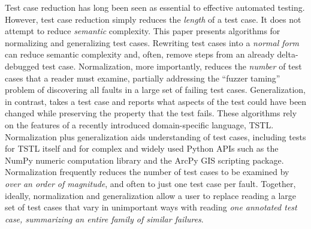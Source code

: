 Test case reduction has long been seen as essential to effective automated testing.  However, test case reduction simply reduces the \emph{length} of a test case.  It does not attempt to reduce \emph{semantic} complexity.  This paper presents algorithms for normalizing and generalizing test cases.  Rewriting test cases into a \emph{normal form} can reduce semantic complexity and, often, remove steps from an already delta-debugged test case.  Normalization, more importantly, reduces the \emph{number} of test cases that a reader must examine, partially addressing the ``fuzzer taming'' problem of discovering all faults in a large set of failing test cases.  Generalization, in contrast, takes a test case and reports what aspects of the test could have been changed while preserving the property that the test fails.  These algorithms rely on the features of a recently introduced domain-specific language, TSTL.  Normalization plus generalization aids understanding of test cases, including tests for TSTL itself and for complex and widely used Python APIs such as the NumPy numeric computation library and the ArcPy GIS scripting package.  Normalization frequently reduces the number of test cases to be examined by \emph{over an order of magnitude}, and often to just one test case per fault.  Together, ideally, normalization and generalization allow a user to replace reading a large set of test cases that vary in unimportant ways with reading \emph{one annotated test case, summarizing an entire family of similar failures}.